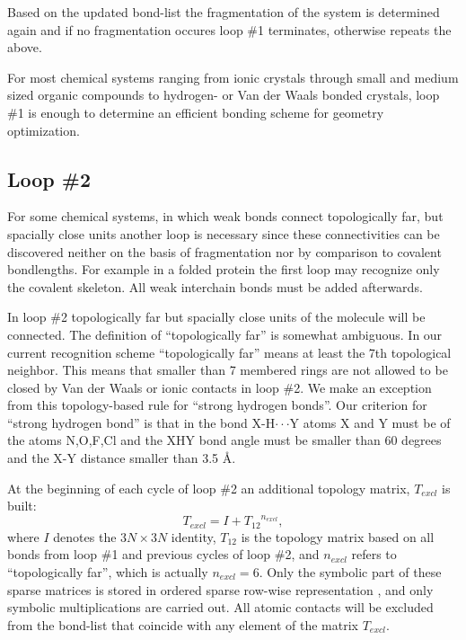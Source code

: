 \documentclass[prl,aps,preprint,superbib,12pt]{revtex4}
\begin{document}
Based on the updated bond-list the fragmentation of the system
is determined again and if no fragmentation occures loop \#1
terminates, otherwise repeats the above.

For most chemical systems ranging from ionic crystals through
small and medium sized organic compounds to hydrogen- 
or Van der Waals bonded crystals, loop \#1 is enough 
to determine an efficient bonding scheme for geometry optimization.  

\subsection{Loop \#2}
For some chemical systems, in which 
weak bonds connect topologically far, but spacially close units
another loop is necessary since these connectivities can 
be discovered neither on the basis of fragmentation nor by comparison
to covalent bondlengths.
For example in a folded protein the first loop may recognize only
the covalent skeleton. All weak interchain bonds must be added
afterwards. 

In loop \#2 topologically far but spacially
close units of the molecule will be connected.    
The definition of ``topologically far'' is somewhat
ambiguous. In our current recognition scheme ``topologically far''
means at least the 7th topological neighbor. This means that
smaller than 7 membered rings are not allowed to 
be closed by Van der Waals
or ionic contacts in loop \#2. We make an exception from 
this topology-based rule for 
``strong hydrogen bonds''. Our criterion for ``strong
hydrogen bond'' is that in the bond X-H$\cdot\cdot\cdot$Y
atoms X and Y must be of the atoms N,O,F,Cl and the XHY bond angle
must be smaller than 60 degrees and the X-Y distance smaller than 
3.5 \AA.

At the beginning of each cycle of loop \#2
an additional topology matrix, $T_{excl}$ is built:
\begin{equation}
T_{excl} = {I+T_{12}}^{n_{excl}} ,
\end{equation}
where $I$ denotes the $3N \times 3N$ identity, $T_{12}$ is the 
topology matrix based on all bonds from loop \#1 and previous 
cycles of loop \#2, and $n_{excl}$ refers to ``topologically far'',
which is actually $n_{excl}=6$.
Only the symbolic part of these sparse matrices is stored 
in ordered sparse row-wise representation \cite{SPissanetzky84},
and only symbolic multiplications are carried out.
All atomic contacts will be excluded from the bond-list
that coincide with any element of the matrix $T_{excl}$. 
\end{document}
